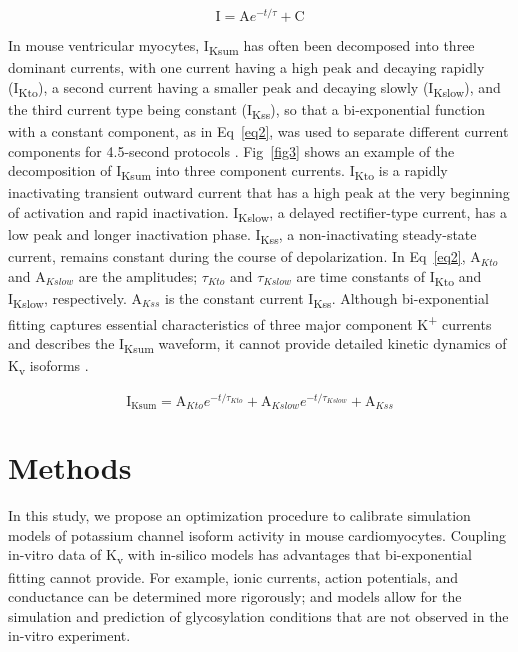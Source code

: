 \documentclass[10pt,letterpaper]{article}
\begin{document}
\begin{equation}
    \mathrm{I} = \mathrm{A}e^{-t/\tau} + \mathrm{C}
    \label{eq1}
\end{equation}

In mouse ventricular myocytes, I\textsubscript{Ksum} has often been decomposed into three dominant currents, with one current having a high peak and decaying rapidly (I\textsubscript{Kto}), a second current having a smaller peak and decaying slowly (I\textsubscript{Kslow}), and the third current type being constant (I\textsubscript{Kss}), so that a bi-exponential function with a constant component, as in Eq~\ref{eq2}, was used to separate different current components for 4.5-second protocols \cite{ednie2015reduced}. Fig~\ref{fig3} shows an example of the decomposition of I\textsubscript{Ksum} into three component currents. I\textsubscript{Kto} is a rapidly inactivating transient outward current that has a high peak at the very beginning of activation and rapid inactivation. I\textsubscript{Kslow}, a delayed rectifier-type current, has a low peak and longer inactivation phase. I\textsubscript{Kss}, a non-inactivating steady-state current, remains constant during the course of depolarization. In Eq~\ref{eq2}, $\mathrm{A}_{Kto}$ and $\mathrm{A}_{Kslow}$ are the amplitudes; $\tau_{Kto}$ and $\tau_{Kslow}$ are time constants of I\textsubscript{Kto} and I\textsubscript{Kslow}, respectively. $\mathrm{A}_{Kss}$ is the constant current I\textsubscript{Kss}. Although bi-exponential fitting captures essential characteristics of three major component K\textsuperscript{+} currents and describes the I\textsubscript{Ksum} waveform, it cannot provide detailed kinetic dynamics of K\textsubscript{v} isoforms \cite{plumlee2016calibrating}. 

\begin{equation}
    \mathrm{I}_{\mathrm{Ksum}} = \mathrm{A}_{Kto} e^{-t/\tau_{Kto}} + \mathrm{A}_{Kslow} e^{-t/\tau_{Kslow}} + \mathrm{A}_{Kss}
    \label{eq2}
\end{equation}

\section*{Methods}
In this study, we propose an optimization procedure to calibrate simulation models of potassium channel isoform activity in mouse cardiomyocytes. Coupling in-vitro data of K\textsubscript{v} with in-silico models has advantages that bi-exponential fitting cannot provide. For example, ionic currents, action potentials, and conductance can be determined more rigorously; and models allow for the simulation and prediction of glycosylation conditions that are not observed in the in-vitro experiment. 
\end{document}

